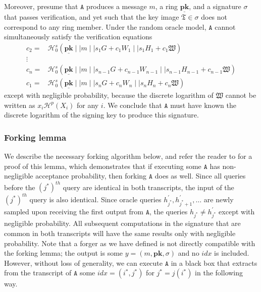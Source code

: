 \documentclass[draft]{llncs} %
\begin{document}
Moreover, presume that $\texttt{A}$ produces a message $m$, a ring $\underline{\textbf{pk}}$, and a signature $\sigma$ that passes verification, and yet such that the key image $\mathfrak{T} \in \sigma$ does not correspond to any ring member. Under the random oracle model, $\texttt{A}$ cannot simultaneously satisfy the verification equations
\begin{align*}
c_{2} =& \mathcal{H}^s_0(\underline{\textbf{pk}} \mid \mid m \mid \mid s_1 G + c_1 W_1 \mid \mid s_1 H_1 + c_1 \mathfrak{W}) \\
\vdots & \\
c_{n} =& \mathcal{H}^s_0(\underline{\textbf{pk}} \mid \mid m \mid \mid s_{n-1} G + c_{n-1} W_{n-1} \mid \mid s_{n-1} H_{n-1} + c_{n-1} \mathfrak{W}) \\
c_{1} =& \mathcal{H}^s_0(\underline{\textbf{pk}} \mid \mid m \mid \mid s_{n} G + c_{n} W_{n} \mid \mid s_{n} H_{n} + c_{n} \mathfrak{W})
\end{align*}
except with negligible probability, because the discrete logarithm of $\mathfrak{W}$ cannot be written as $x_i \mathcal{H}^p(X_i)$ for any $i$. We conclude that $\texttt{A}$ must have known the discrete logarithm of the signing key to produce this signature.


\subsubsection{Forking lemma}
We describe the necessary forking algorithm below, and refer the reader to \cite{bellare} for a proof of this lemma, which demonstrates that if executing some $\texttt{A}$ has non-negligible acceptance probability, then forking $\texttt{A}$ does as well. Since all queries before the $(j^*)^{th}$ query are identical in both transcripts, the input of the $(j^*)^{th}$ query is also identical. Since oracle queries $h_{j^*}^{\prime}, h_{j^*+1}^{\prime}, \ldots$ are newly sampled upon receiving the first output from $\texttt{A}$, the queries $h_{j^*} \neq h_{j^*}^\prime$ except with negligible probability. All subsequent computations in the signature that are common in both transcripts will have the same results only with negligible probability.
Note that a forger as we have defined is not directly compatible with the forking lemma; the output is some $y = (m, \textbf{pk}, \sigma)$ and no $\textit{idx}$ is included.  However, without loss of generality, we can execute $\texttt{A}$ in a black box that extracts from the transcript of $\texttt{A}$ some $\textit{idx} = (i^*, j^*)$ for $j^* = j(i^*)$ in the following way.
\end{document}
